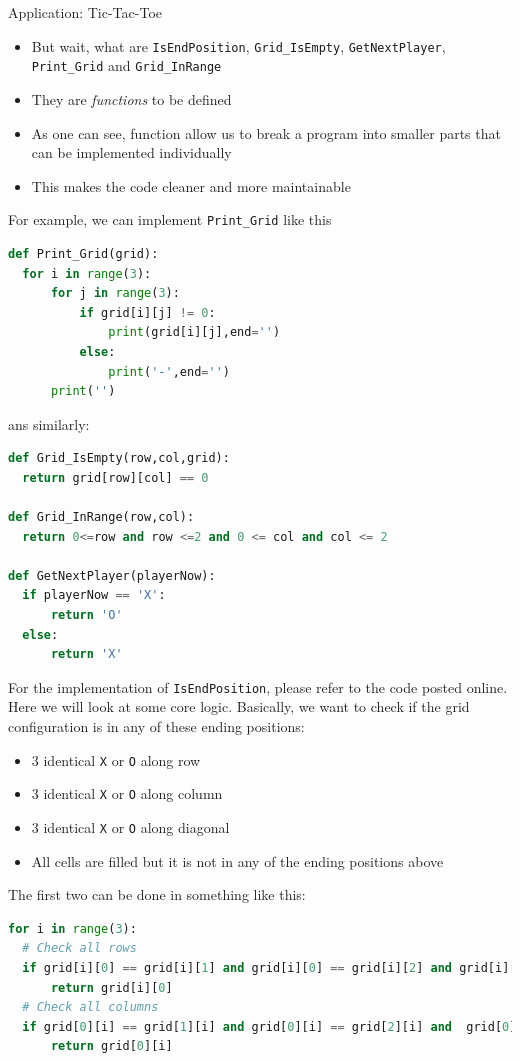 \documentclass[10pt,xcolor={table,dvipsnames},t]{beamer}
\begin{document}
\begin{frame}{Application: Tic-Tac-Toe}
  \begin{itemize}
    \item But wait, what are \texttt{IsEndPosition}, \texttt{Grid\_IsEmpty}, \texttt{GetNextPlayer}, \texttt{Print\_Grid} and  \texttt{Grid\_InRange}
    \item They are \textit{functions} to be defined
    \item As one can see, function allow us to break a program into smaller parts that can be implemented individually
    \item This makes the code cleaner and more maintainable
  \end{itemize}
\end{frame}

\begin{frame}[fragile]
For example, we can implement \texttt{Print\_Grid} like this
\begin{lstlisting}[language=python]
def Print_Grid(grid):
  for i in range(3):
      for j in range(3):
          if grid[i][j] != 0:
              print(grid[i][j],end='')
          else:
              print('-',end='')
      print('')
\end{lstlisting}
ans similarly:
\begin{lstlisting}[language=python]
def Grid_IsEmpty(row,col,grid):
  return grid[row][col] == 0

def Grid_InRange(row,col):
  return 0<=row and row <=2 and 0 <= col and col <= 2

def GetNextPlayer(playerNow):
  if playerNow == 'X':
      return 'O'
  else:
      return 'X'
\end{lstlisting}
\end{frame}

\begin{frame}[fragile]
  For the implementation of \texttt{IsEndPosition}, please refer to the code posted online. Here we will look at some core logic. Basically, we want to check if the grid configuration is in any of these ending positions:
  \begin{itemize}
    \item 3 identical \texttt{X} or \texttt{O} along row 
    \item 3 identical \texttt{X} or \texttt{O} along column
    \item 3 identical \texttt{X} or \texttt{O} along diagonal 
    \item All cells are filled but it is not in any of the ending positions above
  \end{itemize}
  The first two can be done in something like this:
\begin{lstlisting}[language=python]
for i in range(3):
  # Check all rows 
  if grid[i][0] == grid[i][1] and grid[i][0] == grid[i][2] and grid[i][0] != 0:
      return grid[i][0]
  # Check all columns
  if grid[0][i] == grid[1][i] and grid[0][i] == grid[2][i] and  grid[0][i] != 0:
      return grid[0][i]
\end{lstlisting}
\end{frame}
\end{document}

